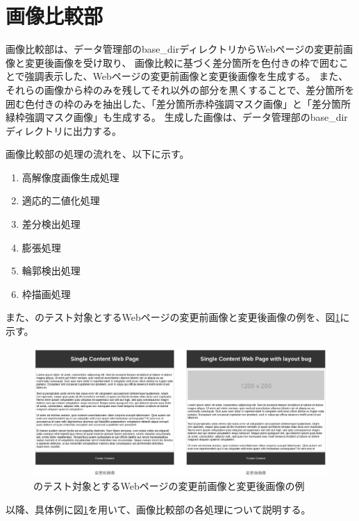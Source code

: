 \section{画像比較部}\label{sec:Difference_extraction_section}
画像比較部は、データ管理部のbase\_dirディレクトリからWebページの変更前画像と変更後画像を受け取り、
画像比較に基づく差分箇所を色付きの枠で囲むことで強調表示した、Webページの変更前画像と変更後画像を生成する。
また、それらの画像から枠のみを残してそれ以外の部分を黒くすることで、差分箇所を囲む色付きの枠のみを抽出した、「差分箇所赤枠強調マスク画像」と「差分箇所緑枠強調マスク画像」も生成する。
生成した画像は、データ管理部のbase\_dirディレクトリに出力する。
\par
画像比較部の処理の流れを、以下に示す。
\begin{enumerate}
    \item 高解像度画像生成処理
    \item 適応的二値化処理
    \item 差分検出処理
    \item 膨張処理
    \item 輪郭検出処理
    \item 枠描画処理
\end{enumerate}
また、\toolName のテスト対象とするWebページの変更前画像と変更後画像の例を、図\ref{fig: img_original_bf_af}に示す。
\begin{figure}[tp]
    \begin{center}
        \includegraphics[width=1.0\columnwidth]{image/4_img_original_bf_af.png}
        \caption{\toolName のテスト対象とするWebページの変更前画像と変更後画像の例}
        \label{fig: img_original_bf_af}
    \end{center}
\end{figure}
以降、具体例に図\ref{fig: img_original_bf_af}を用いて、画像比較部の各処理について説明する。


